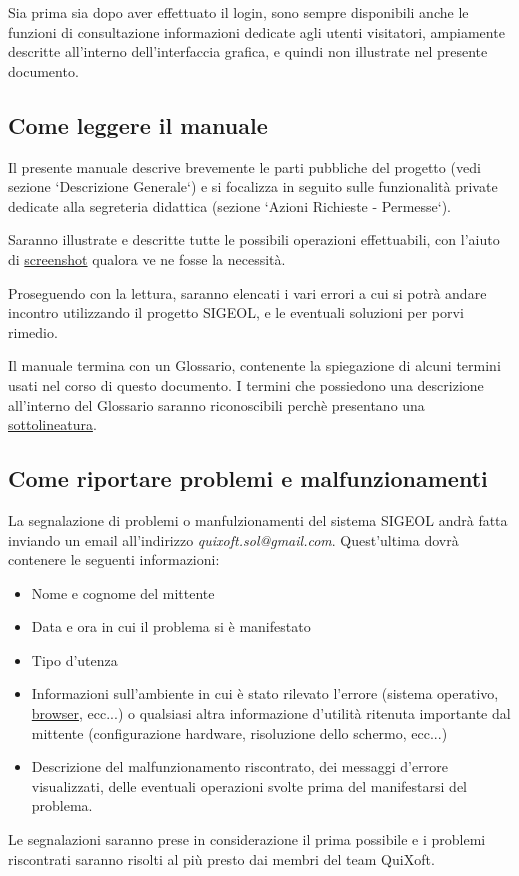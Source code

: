 \documentclass[11pt,a4paper]{article}
\begin{document}
Sia prima sia dopo aver effettuato il login, sono sempre disponibili anche le funzioni di consultazione informazioni dedicate agli utenti visitatori, ampiamente descritte all'interno dell'interfaccia grafica, e quindi non illustrate nel presente documento.
\subsection{Come leggere il manuale}
Il presente manuale descrive brevemente le parti pubbliche del progetto (vedi sezione `Descrizione Generale`) e si focalizza in seguito sulle funzionalità private dedicate alla segreteria didattica (sezione `Azioni Richieste - Permesse`).

Saranno illustrate e descritte tutte le possibili operazioni effettuabili, con l'aiuto di \underline{screenshot} qualora ve ne fosse la necessità.

Proseguendo con la lettura, saranno elencati i vari errori a cui si potrà andare incontro utilizzando il progetto SIGEOL, e le eventuali soluzioni per porvi rimedio.

Il manuale termina con un Glossario, contenente la spiegazione di alcuni termini usati nel corso di questo documento.
I termini che possiedono una descrizione all'interno del Glossario saranno riconoscibili perchè presentano una \underline{sottolineatura}.

\subsection{Come riportare problemi e malfunzionamenti}
La segnalazione di problemi o manfulzionamenti del sistema SIGEOL andrà fatta inviando un email all'indirizzo \textit{quixoft.sol@gmail.com}.
Quest'ultima dovrà contenere le seguenti informazioni:
\begin{itemize}
 \item Nome e cognome del mittente
 \item Data e ora in cui il problema si è manifestato
 \item Tipo d'utenza
 \item Informazioni sull'ambiente in cui è stato rilevato l'errore (sistema operativo, \underline{browser}, ecc...) o qualsiasi altra informazione d'utilità ritenuta importante dal mittente (configurazione hardware, risoluzione dello schermo, ecc...)
 \item Descrizione del malfunzionamento riscontrato, dei messaggi d'errore visualizzati, delle eventuali operazioni svolte prima del manifestarsi del problema.
\end{itemize}
Le segnalazioni saranno prese in considerazione il prima possibile e i problemi riscontrati saranno risolti al più presto dai membri del team QuiXoft.
\end{document}
